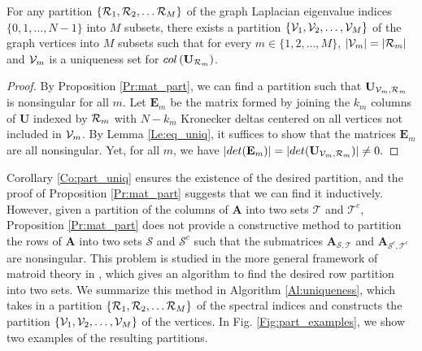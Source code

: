 \documentclass[journal, 10pt]{IEEEtran}
\begin{document}
\begin{corollary}\label{Co:part_uniq}
For any %
partition $\{{\cal R}_1,{\cal R}_2,\ldots {\cal R}_M \}$ of the graph Laplacian eigenvalue indices $\{0,1,\ldots,N-1\}$ into $M$ subsets, there exists a partition $\{{\mathcal{V}}_1,{\mathcal{V}}_2,\ldots,{\mathcal{V}}_M\}$ of the graph vertices into $M$ subsets 
such that for every $m \in \{1,2,\ldots,M\}$, $|\V_m|=|{\cal R}_m|$ and 
${\mathcal{V}}_m$ is a uniqueness set for $\mbox{col}\left(\mathbf{U}_{{\cal R}_m}\right)$.%
\end{corollary}
\begin{proof}
By Proposition \ref{Pr:mat_part}, we can find a partition such that $\mathbf{U}_{\V_m,{\cal R}_m}$ is nonsingular for all $m$. Let $\mathbf{E}_m$ be the matrix formed by joining the $k_m$ columns of  $\mathbf{U}$ indexed by ${\cal R}_m$ with $N-k_m$ Kronecker deltas centered on all vertices not included in ${\mathcal{V}}_m$. By Lemma \ref{Le:eq_uniq}, it suffices to show that the matrices $\mathbf{E}_m$ are all nonsingular. Yet, for all $m$, we have
$|\mbox{det}(\mathbf{E}_m)|=|\mbox{det}(\mathbf{U}_{\V_m,{\cal R}_m})| \neq 0.$
\end{proof}

Corollary \ref{Co:part_uniq} ensures the existence of the desired partition, and the proof of Proposition \ref{Pr:mat_part} suggests that we can find it inductively. However, given a partition of the columns of ${\mathbf{A}}$ into two sets $\mathcal{T}$ and $\mathcal{T}^c$, Proposition \ref{Pr:mat_part} does not provide a constructive method to partition the rows of ${\mathbf{A}}$ into two sets $\mathcal{S}$ and $\mathcal{S}^c$ such that the submatrices ${\mathbf{A}}_{{\mathcal{S}},{\mathcal{T}}}$ and ${\mathbf{A}}_{{\mathcal{S}^c},{\mathcal{T}}^c}$ are nonsingular. This problem is studied in the more general framework of matroid theory in \cite{greene_magnanti}, which gives an algorithm to find the desired row partition into two sets. We summarize this method in Algorithm \ref{Al:uniqueness}, which takes in a partition $\{{\cal R}_1,{\cal R}_2,\ldots {\cal R}_M \}$ of the spectral indices and constructs the partition $\{{\mathcal{V}}_1,{\mathcal{V}}_2,\ldots,{\mathcal{V}}_M\}$ of the vertices.  In Fig. \ref{Fig:part_examples}, we show two examples of the resulting partitions.
\end{document}
